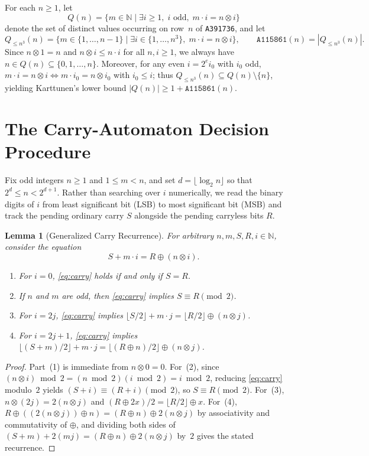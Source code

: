 \documentclass[11pt]{article}
\newtheorem{lemma}[theorem]{Lemma}
\theoremstyle{definition}
\newcommand{\N}{\mathbb{N}}
\newcommand{\seq}[1]{\texttt{#1}}
\newcommand{\clmul}{\otimes}
\begin{document}
For each $n \ge 1$, let
\[
Q(n) = \{ m \in \N \mid \exists i \ge 1,\; i \text{ odd},\; m \cdot i = n \clmul i \}
\]
denote the set of distinct values occurring on row~$n$ of \seq{A391736}, and let
\[
Q_{\le n^3}(n) = \{ m \in \{1, \dots, n-1\} \mid \exists i \in \{1, \dots, n^3\},\; m \cdot i = n \clmul i \}, \qquad \seq{A115861}(n) = |Q_{\le n^3}(n)|.
\]
Since $n \clmul 1 = n$ and $n \clmul i \le n \cdot i$ for all $n, i \ge 1$, we always have $n \in Q(n) \subseteq \{0, 1, \dots, n\}$. Moreover, for any even $i = 2^e i_0$ with $i_0$ odd, $m \cdot i = n \clmul i \iff m \cdot i_0 = n \clmul i_0$ with $i_0 \le i$; thus $Q_{\le n^3}(n) \subseteq Q(n) \setminus \{n\}$, yielding Karttunen's lower bound $|Q(n)| \ge 1 + \seq{A115861}(n)$.

\section{The Carry-Automaton Decision Procedure}

Fix odd integers $n \ge 1$ and $1 \le m < n$, and set $d = \lfloor \log_2 n \rfloor$ so that $2^d \le n < 2^{d+1}$. Rather than searching over $i$ numerically, we read the binary digits of $i$ from least significant bit (LSB) to most significant bit (MSB) and track the pending ordinary carry $S$ alongside the pending carryless bits $R$.

\begin{lemma}[Generalized Carry Recurrence]
\label{lem:carry-rec}
For arbitrary $n, m, S, R, i \in \N$, consider the equation
\begin{equation}
\label{eq:carry}
S + m \cdot i = R \oplus (n \clmul i).
\end{equation}
\begin{enumerate}
\item For $i = 0$, \eqref{eq:carry} holds if and only if $S = R$.
\item If $n$ and $m$ are odd, then \eqref{eq:carry} implies $S \equiv R \pmod 2$.
\item For $i = 2j$, \eqref{eq:carry} implies $\lfloor S/2 \rfloor + m \cdot j = \lfloor R/2 \rfloor \oplus (n \clmul j)$.
\item For $i = 2j + 1$, \eqref{eq:carry} implies $\lfloor (S + m)/2 \rfloor + m \cdot j = \lfloor (R \oplus n)/2 \rfloor \oplus (n \clmul j)$.
\end{enumerate}
\end{lemma}

\begin{proof}
Part~(1) is immediate from $n \clmul 0 = 0$. For~(2), since $(n \clmul i) \bmod 2 = (n \bmod 2)(i \bmod 2) = i \bmod 2$, reducing \eqref{eq:carry} modulo~$2$ yields $(S + i) \equiv (R + i) \pmod 2$, so $S \equiv R \pmod 2$. For~(3), $n \clmul (2j) = 2(n \clmul j)$ and $(R \oplus 2x)/2 = \lfloor R/2 \rfloor \oplus x$. For~(4), $R \oplus ((2(n \clmul j)) \oplus n) = (R \oplus n) \oplus 2(n \clmul j)$ by associativity and commutativity of $\oplus$, and dividing both sides of $(S + m) + 2(mj) = (R \oplus n) \oplus 2(n \clmul j)$ by~$2$ gives the stated recurrence.
\end{proof}
\end{document}
